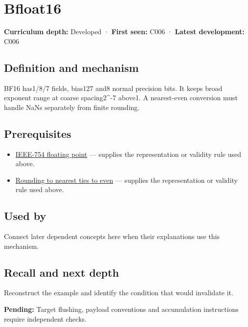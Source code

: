 \hypertarget{appendix-18b8dd966b5d}{}\label{referencestart:appendix-18b8dd966b5d}
\section{Bfloat16}\label{appendix-18b8dd966b5d-bfloat16}

\textbf{Curriculum depth:} Developed · \textbf{First seen:} C006 · \textbf{Latest development:} C006

\subsection{Definition and mechanism}\label{appendix-18b8dd966b5d-definition-and-mechanism}

BF16 has1/8/7 fields, bias127 and8 normal precision bits. It keeps broad exponent range at coarse spacing2\^{}-7 above1. A nearest-even conversion must handle NaNs separately from finite rounding.

\subsection{Prerequisites}\label{appendix-18b8dd966b5d-prerequisites}

\begin{itemize}
\tightlist
\item
  \hyperref[appendix-343615f49ddf]{IEEE-754 floating point} --- supplies the representation or validity rule used above.
\item
  \hyperref[appendix-614afe1de592]{Rounding to nearest ties to even} --- supplies the representation or validity rule used above.
\end{itemize}

\subsection{Used by}\label{appendix-18b8dd966b5d-used-by}

Connect later dependent concepts here when their explanations use this mechanism.

\subsection{Recall and next depth}\label{appendix-18b8dd966b5d-recall-and-next-depth}

Reconstruct the example and identify the condition that would invalidate it.

\textbf{Pending:} Target flushing, payload conventions and accumulation instructions require independent checks.

